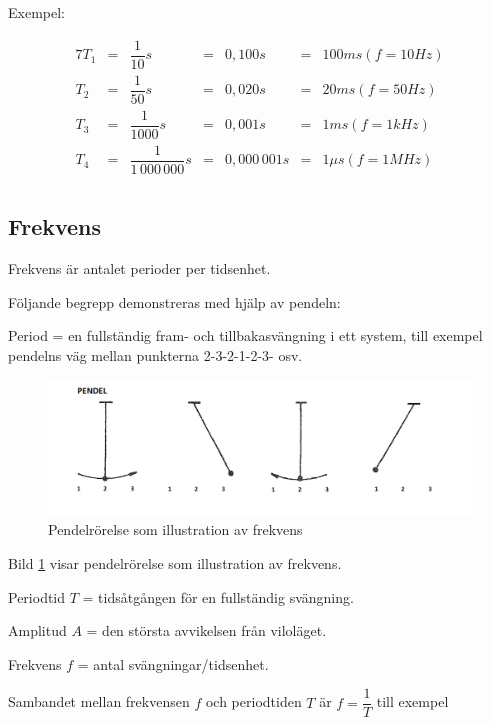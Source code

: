 Exempel:

\begin{alignat*}{7}
T_1&=&\dfrac{1}{10} \unit{s}       &=&  0,100 \unit{s}     &=& 100 ms (f = 10 \unit{Hz})\\
T_2&=&\dfrac{1}{50} \unit{s}       &=&  0,020 \unit{s}     &=& 20 ms (f = 50 \unit{Hz})\\
T_3&=&\dfrac{1}{1000} \unit{s}     &=&  0,001 \unit{s}     &=& 1 ms (f = 1 \unit{kHz})\\
T_4&=&\dfrac{1}{1\,000\,000} \unit{s}  &=&  0,000\,001 \unit{s}  &=& 1 \mu s (f = 1 \unit{MHz})\\
\end{alignat*}

\subsection{Frekvens}

Frekvens är antalet perioder per tidsenhet.

Följande begrepp demonstreras med hjälp av pendeln:

Period = en fullständig fram- och tillbakasvängning i ett system, till exempel
pendelns väg mellan punkterna 2-3-2-1-2-3- osv.

\begin{figure}[ht]
	\includegraphics[width=\textwidth]{images/cropped_pdfs/bild_2_1-33.pdf}
	\caption{Pendelrörelse som illustration av frekvens}
	\label{fig:BildII1-33}
\end{figure}

Bild \ref{fig:BildII1-33} visar pendelrörelse som illustration av frekvens.

Periodtid \(T\) = tidsåtgången för en fullständig svängning.

Amplitud \(A\) = den största avvikelsen från viloläget.

Frekvens \(f\) = antal svängningar/tidsenhet.

Sambandet mellan frekvensen \(f\) och periodtiden \(T\) är
\(f=\dfrac{1}{T}\) till exempel


